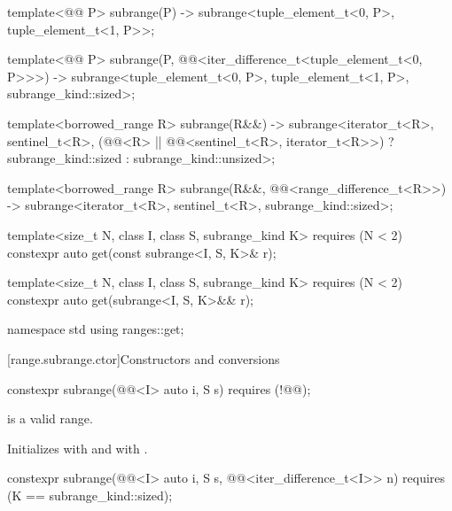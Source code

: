 \begin{codeblock}
{  template<@@ P>
    subrange(P) -> subrange<tuple_element_t<0, P>, tuple_element_t<1, P>>;

  template<@@ P>
    subrange(P, @@<iter_difference_t<tuple_element_t<0, P>>>) ->
      subrange<tuple_element_t<0, P>, tuple_element_t<1, P>, subrange_kind::sized>;

  template<borrowed_range R>
    subrange(R&&) ->
      subrange<iterator_t<R>, sentinel_t<R>,
               (@@<R> || @@<sentinel_t<R>, iterator_t<R>>)
                 ? subrange_kind::sized : subrange_kind::unsized>;

  template<borrowed_range R>
    subrange(R&&, @@<range_difference_t<R>>) ->
      subrange<iterator_t<R>, sentinel_t<R>, subrange_kind::sized>;

  template<size_t N, class I, class S, subrange_kind K>
    requires (N < 2)
    constexpr auto get(const subrange<I, S, K>& r);

  template<size_t N, class I, class S, subrange_kind K>
    requires (N < 2)
    constexpr auto get(subrange<I, S, K>&& r);
}

namespace std {
  using ranges::get;
}
\end{codeblock}

[range.subrange.ctor]{Constructors and conversions}

%
\begin{itemdecl}
constexpr subrange(@@<I> auto i, S s) requires (!@@);
\end{itemdecl}

\begin{itemdescr}
\pnum
\expects
{} is a valid range.

\pnum
\effects
Initializes  with  and  with
.
\end{itemdescr}

%
\begin{itemdecl}
constexpr subrange(@@<I> auto i, S s,
                   @@<iter_difference_t<I>> n)
  requires (K == subrange_kind::sized);
\end{itemdecl}

